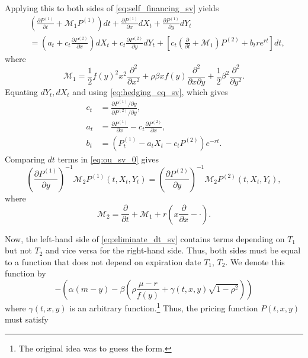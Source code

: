 \documentclass[a4paper,12pt]{article}
\numberwithin{equation}{section}
\theoremstyle{definition}
\theoremstyle{remark}
\begin{document}
Applying this to both sides of \eqref{eq:self_financing_sv} yields 
\begin{equation}
    \label{eq:ou_sv_0}
    \begin{split}
        &\left(\frac{\partial P^{(1)}}{\partial t}+\mathcal{M}_{1}P^{(1)}\right)dt+
        \frac{\partial P^{(1)}}{\partial x}dX_{t}+\frac{\partial P^{(1)}}{\partial y}dY_{t} \\
        &=\left(a_{t}+c_{t}\frac{\partial P^{(2)}}{\partial x}\right)dX_{t}
        +c_{t}\frac{\partial P^{(2)}}{\partial y}dY_{t}
        +\left[c_{t}\left(\frac{\partial }{\partial t}+\mathcal{M}_{1}\right)P^{(2)}+b_{t}re^{rt}\right]dt,
    \end{split}
\end{equation}
where 
\begin{equation}
    \mathcal{M}_{1}=\frac{1}{2}f(y)^{2}x^{2}\frac{\partial^{2} }{\partial {x}^{2}}
    +\rho\beta xf(y)\frac{\partial^{2} }{\partial x\partial y}
    +\frac{1}{2}\beta^{2}\frac{\partial^{2} }{\partial {y}^{2}}.
\end{equation}
Equating $dY_{t}, dX_{t}$ and using \eqref{eq:hedging_eq_sv}, 
which gives 
\begin{equation}
    \begin{split}
        c_{t}&=\frac{\partial P^{(1)}/\partial y}{\partial P^{(2)}/\partial y}, \\
        a_{t}&=\frac{\partial P^{(1)}}{\partial x}-c_{t}\frac{\partial P^{(2)}}{\partial x}, \\
        b_{t}&=(P_{t}^{(1)}-a_{t}X_{t}-c_{t}P^{(2)})e^{-rt}.
    \end{split}
\end{equation}
Comparing $dt$ terms in \eqref{eq:ou_sv_0} gives 
\begin{equation}\label{eq:eliminate_dt_sv}
    \left(\frac{\partial P^{(1)}}{\partial y}\right)^{-1}
    \mathcal{M}_{2}P^{(1)}(t,X_{t},Y_{t})
    =\left(\frac{\partial P^{(2)}}{\partial y}\right)^{-1}
    \mathcal{M}_{2}P^{(2)}(t,X_{t},Y_{t}),
\end{equation}
where 
\begin{equation}
    \mathcal{M}_{2}=\frac{\partial }{\partial t}+\mathcal{M}_{1}
    +r\left(x\frac{\partial }{\partial x}-\cdot\right).
\end{equation}

Now, the left-hand side of \eqref{eq:eliminate_dt_sv} contains 
terms depending on $T_{1}$ but not $T_{2}$ and vice versa for the 
right-hand side. Thus, both sides must be equal to a function that 
does not depend on expiration date $T_{1},\,T_{2}$. We denote this 
function by 
\begin{equation}
    -\left(\alpha(m-y)-\beta\left(\rho\frac{\mu-r}{f(y)}
    +\gamma(t,x,y)\sqrt{1-\rho^{2}}\right)\right)
\end{equation}
where $\gamma(t,x,y)$ is an arbitrary function.\footnote{The 
original idea was to guess the form.} Thus, the pricing function 
$P(t,x,y)$ must satisfy
\end{document}
